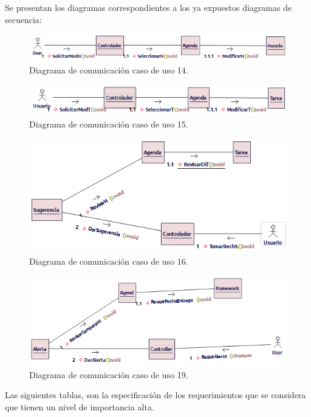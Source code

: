 Se presentan los diagramas correspondientes a los ya expuestos diagramas de secuencia:

\begin{figure}[H]
	\centering
	\includegraphics[width=0.7\linewidth]{diseno/requerimientos/imagenes/comunicacion1}
	\caption{Diagrama de comunicación caso de uso 14.}
	\label{fig:gantt}
\end{figure}
\begin{figure}[H]
	\centering
	\includegraphics[width=0.7\linewidth]{diseno/requerimientos/imagenes/comunicacion2}
	\caption{Diagrama de comunicación caso de uso 15.}
	\label{fig:gantt}
\end{figure}
\begin{figure}[H]
	\centering
	\includegraphics[width=0.7\linewidth]{diseno/requerimientos/imagenes/comunicacion3}
	\caption{Diagrama de comunicación caso de uso 16.}
	\label{fig:gantt}
\end{figure}
\begin{figure}[H]
	\centering
	\includegraphics[width=0.7\linewidth]{diseno/requerimientos/imagenes/comunicacion4}
	\caption{Diagrama de comunicación caso de uso 19.}
	\label{fig:gantt}
\end{figure}

Las siguientes tablas, son la especificación de los requerimientos que se considera que tienen un nivel de importancia alta.

 

